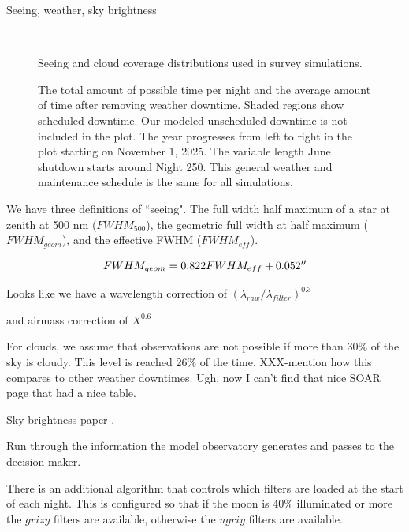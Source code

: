 \documentclass[]{aastex631}
\begin{document}
Seeing, weather, sky brightness

\begin{figure}
    \centering
     \\
    \caption{Seeing and cloud coverage distributions used in survey simulations. }
    \label{fig:seeing_clouds}
\end{figure}


\begin{figure}
    \centering
    \caption{The total amount of possible time per night and the average amount of time
after removing weather downtime. Shaded regions show scheduled downtime. Our modeled
unscheduled downtime is not included in the plot. The year progresses from left to right in
the plot starting on November 1, 2025. The variable length June shutdown starts around Night
250. This general weather and maintenance schedule is the same for all simulations.}
    \label{fig:downtime}
\end{figure}

We have three definitions of ``seeing". The full width half maximum of a star at zenith at 500 nm ($FWHM_{500}$), the geometric full width at half maximum ($FWHM_{geom}$), and the effective FWHM ($FWHM_{eff}$).

\begin{equation}
    FWHM_{geom} = 0.822 FWHM_{eff} + 0.052\arcsec
\end{equation}

Looks like we have a wavelength correction of $(\lambda_{raw}/\lambda_{filter})^{0.3}$

and airmass correction of $X^{0.6}$

For clouds, we assume that observations are not possible if more than 30\% of the sky is cloudy. This level is reached 26\% of the time. XXX-mention how this compares to other weather downtimes. Ugh, now I can't find that nice SOAR page that had a nice table.

Sky brightness paper \citep{Yoachim2016}. 


Run through the information the model observatory generates and passes to the decision maker.

There is an additional algorithm that controls which filters are loaded at the start of each night. This is configured so that if the moon is 40\% illuminated or more the $grizy$ filters are available, otherwise the $ugriy$ filters are available.
\end{document}

